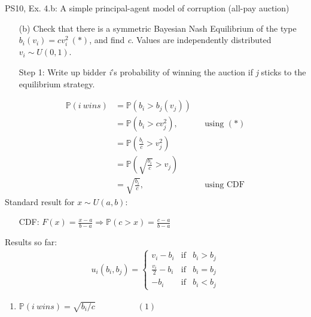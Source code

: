 \begin{frame}{PS10, Ex. 4.b: A simple principal-agent model of corruption (all-pay auction)}
    \begin{itemize}
      \item[(b)] Check that there is a symmetric Bayesian Nash Equilibrium of the type $b_i(v_i) = cv_i^2\ (*)$, and find \textit{c}. Values are independently distributed $v_i\sim U(0, 1)$.
    \end{itemize} \vspace{-8pt}
    \begin{multicols}{2}
      \begin{itemize}
        \item[Step 1:] Write up bidder \textit{i}'s probability of winning the auction if \textit{j} sticks to the equilibrium strategy.
      \end{itemize} \vspace{-8pt}
      \begin{align*}
        \mathbb{P}(i\ wins)&=\mathbb{P}(b_i>b_j(v_j))\\
                           &=\mathbb{P}(b_i>cv_j^2),&&\text{using }(*)\\
                           &=\mathbb{P}\left(\frac{b_i}{c}>v_j^2\right)\\
                           &=\mathbb{P}\left(\sqrt{\frac{b_i}{c}}>v_j\right)\\
                           &=\sqrt{\frac{b_i}{c}},&&\text{using CDF}
      \end{align*}
      \vfill\null\columnbreak
      Standard result for $x\sim U(a, b):$ \vspace{-6pt}
      \begin{itemize}
        \item[CDF:] $F(x)=\frac{x-a}{b-a}\Rightarrow\mathbb{P}(c>x)=\frac{c-a}{b-a}$
      \end{itemize}
      \vspace{-6pt}
      Results so far: \vspace{-6pt}
      \begin{align*}
        u_i(b_i,b_j)=\left\{\begin{array}{lcl}
          v_i-b_i           & \text{if} & b_i>b_j \\
          \frac{v_i}{2}-b_i & \text{if} & b_i=b_j \\
          -b_i              & \text{if} & b_i<b_j
        \end{array}\right.
      \end{align*} \vspace{-16pt}
      \begin{enumerate}
        \item $\mathbb{P}(i\ wins)=\sqrt{b_i/c}\quad\quad\quad\quad\quad(1)$
      \end{enumerate}
      \vfill\null
    \end{multicols}
\end{frame}
